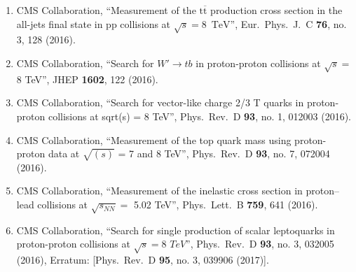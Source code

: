\begin{enumerate}
\item CMS Collaboration, ``Measurement of the $\mathrm{t}\overline{{\mathrm{t}}}$ production cross section in the all-jets final state in pp collisions at $\sqrt{s}=8$ $\,\text {TeV}$'', Eur.\ Phys.\ J.\ C {\bf 76}, no. 3, 128 (2016).

\item CMS Collaboration, ``Search for $W' \to tb$ in proton-proton collisions at $\sqrt{s} = $ 8 TeV'', JHEP {\bf 1602}, 122 (2016).

\item CMS Collaboration, ``Search for vector-like charge 2/3 T quarks in proton-proton collisions at sqrt(s) = 8 TeV'', Phys.\ Rev.\ D {\bf 93}, no. 1, 012003 (2016).

\item CMS Collaboration, ``Measurement of the top quark mass using proton-proton data at ${\sqrt{(s)}}$ = 7 and 8 TeV'', Phys.\ Rev.\ D {\bf 93}, no. 7, 072004 (2016).

\item CMS Collaboration, ``Measurement of the inelastic cross section in proton–lead collisions at $\sqrt {s_{NN}}=$ 5.02 TeV'', Phys.\ Lett.\ B {\bf 759}, 641 (2016).

\item CMS Collaboration, ``Search for single production of scalar leptoquarks in proton-proton collisions at $\sqrt{s} = 8$ $TeV$'', Phys.\ Rev.\ D {\bf 93}, no. 3, 032005 (2016), Erratum: [Phys.\ Rev.\ D {\bf 95}, no. 3, 039906 (2017)].


\end{enumerate}
